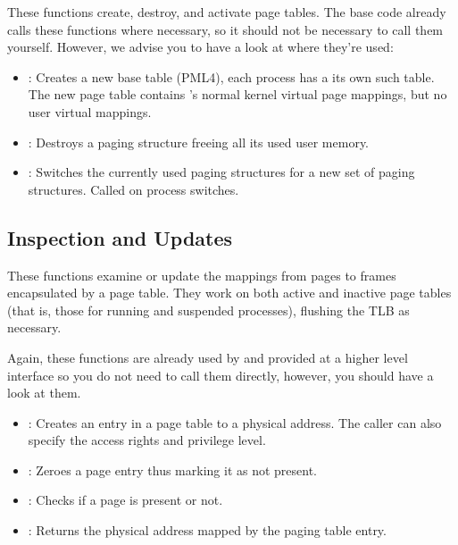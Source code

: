 \begin{appendices}
These functions create, destroy, and activate page tables. The base \projectname code already calls
these functions where necessary, so it should not be necessary to call them yourself. However, we
advise you to have a look at where they're used:

\begin{itemize}
	\item {}: Creates a new base table (PML4), each process has a its
own such table.  The new page table contains \projectname's normal kernel virtual page mappings,
but no user virtual mappings.

	\item {}: Destroys a paging structure freeing all its used user
memory.

	\item {}: Switches the currently used paging structures for a new
set of paging structures. Called on process switches.
\end{itemize}


\subsection{Inspection and Updates}

These functions examine or update the mappings from pages to frames encapsulated by a page table.
They work on both active and inactive page tables (that is, those for running and suspended
processes), flushing the TLB as necessary.

Again, these functions are already used by \projectname and provided at a higher level interface so
you do not need to call them directly, however, you should have a look at them.

\begin{itemize}
	\item {}: Creates an entry in a page table to a physical address. The caller can also
specify the access rights and privilege level.

	\item {}: Zeroes a page entry thus marking it as not present.

	\item {}: Checks if a page is present or not.

	\item {}: Returns the physical address mapped by the paging table
entry.
\end{itemize}


\end{appendices}
